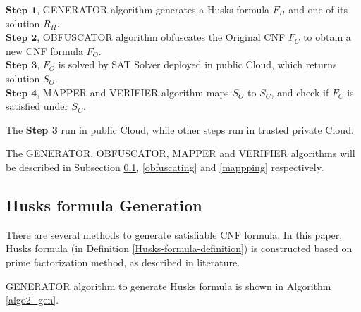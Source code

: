 \documentclass[conference,compsocconf]{IEEEtran}
\begin{document}
$\textbf{Step 1}$, GENERATOR algorithm generates a Husks formula $F_H$ and one of its solution $R_H$.\\
$\textbf{Step 2}$, OBFUSCATOR algorithm obfuscates the Original CNF $F_C$ to obtain a new CNF formula $F_O$.\\
$\textbf{Step 3}$, $F_O$ is solved by SAT Solver deployed in public Cloud, which returns solution $S_O$.\\
$\textbf{Step 4}$, MAPPER and VERIFIER algorithm maps $S_O$ to $S_C$, and check if $F_C$ is satisfied under $S_C$.
% 
% 
% 

The \textbf{Step 3} run in public Cloud, while other steps run in trusted private Cloud.

The GENERATOR, OBFUSCATOR, MAPPER and VERIFIER algorithms will be described in Subsection \ref{genhusk}, \ref{obfuscating}
and \ref{mappping} respectively.

\subsection{Husks formula Generation}\label{genhusk}

There are several methods to generate satisfiable CNF formula\cite{microgenSAT,genSAT}.
In this paper, Husks formula (in Definition \ref{Husks-formula-definition}) is constructed based on prime factorization method,
as described in literature\cite{genSAT}.

GENERATOR algorithm to generate Husks formula is shown in Algorithm \ref{algo2_gen}.
%
%
\end{document}
